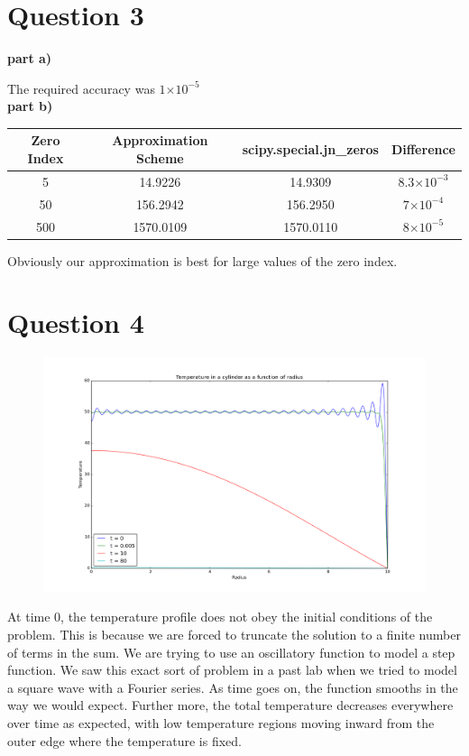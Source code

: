 \documentclass[a4paper,12pt]{article}
\providecommand{\e}[1]{\ensuremath{\times 10^{#1}}}
\begin{document}
\section{Question 3}

\textbf{part a)}

The required accuracy was $1\e{-5}$\\

\textbf{part b)}

\begin{table}[H]
  \centering
  \begin{tabular}{|c||c||c|c|}
    \hline
    Zero Index & Approximation Scheme & scipy.special.jn\_zeros & Difference\\
    \hline
    \hline
    5 & 14.9226 & 14.9309 & $8.3\e{-3}$\\
    \hline
    50 & 156.2942 & 156.2950 & $7\e{-4}$\\
    \hline
    500 & 1570.0109 & 1570.0110 & $8\e{-5}$\\
    \hline
  \end{tabular}
\end{table}

Obviously our approximation is best for large values of the zero index.

\section{Question 4} 

\begin{figure}[H]
\centering
\includegraphics[width = \linewidth]{indepq4.png}
\caption{}
\label{fig:q4}
\end{figure}

At time 0, the temperature profile does not obey the initial conditions of the problem. This is because we are forced to truncate the solution to a finite number of terms in the sum. We are trying to use an oscillatory function to model a step function. We saw this exact sort of problem in a past lab when we tried to model a square wave with a Fourier series. As time goes on, the function smooths in the way we would expect. Further more, the total temperature decreases everywhere over time as expected, with low temperature regions moving inward from the outer edge where the temperature is fixed.
\end{document}
